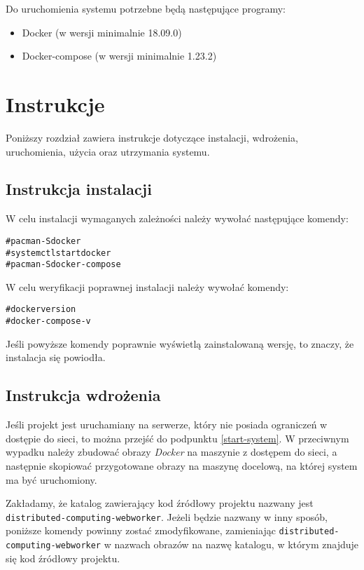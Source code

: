 \documentclass[a4paper,11pt,twoside]{report}
\theoremstyle{definition}
\begin{document}
		Do uruchomienia systemu potrzebne będą następujące programy:
		
		\begin{itemize}
			\item Docker (w wersji minimalnie 18.09.0)
			\item Docker-compose (w wersji minimalnie 1.23.2)
		\end{itemize}
    
    \section{Instrukcje}
        Poniższy rozdział zawiera instrukcje dotyczące instalacji, wdrożenia, uruchomienia, użycia oraz utrzymania systemu.
    
	\subsection{Instrukcja instalacji}
		W celu instalacji wymaganych zależności należy wywołać następujące komendy:

		\begin{alltt}
	# pacman -S docker
	# systemctl start docker
	# pacman -S docker-compose
		\end{alltt}

		W celu weryfikacji poprawnej instalacji należy wywołać komendy:
		\begin{alltt}
	# docker version
	# docker-compose -v
		\end{alltt}

		Jeśli powyższe komendy poprawnie wyświetlą zainstalowaną wersję, to znaczy, że instalacja się powiodła. 

	\subsection{Instrukcja wdrożenia}
	
		Jeśli projekt jest uruchamiany na serwerze, który nie posiada ograniczeń w dostępie do sieci, to można przejść do podpunktu \ref{start-system}. W przeciwnym wypadku należy zbudować obrazy \textit{Docker} na maszynie z dostępem do sieci, a następnie skopiować przygotowane obrazy na maszynę docelową, na której system ma być uruchomiony.
		
		Zakładamy, że katalog zawierający kod źródłowy projektu nazwany jest \texttt{distributed-computing-webworker}. Jeżeli będzie nazwany w inny sposób, poniższe komendy powinny zostać zmodyfikowane, zamieniając \texttt{distributed-computing-webworker} w nazwach obrazów na nazwę katalogu, w którym znajduje się kod źródłowy projektu.
		
\end{document}
